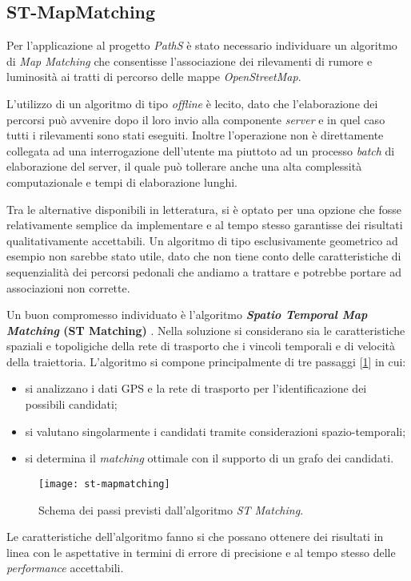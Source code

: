 \subsection{ST-MapMatching}
Per l'applicazione al progetto \emph{PathS} è stato necessario individuare un algoritmo di \emph{Map Matching} che consentisse l'associazione dei rilevamenti di rumore e luminosità ai tratti di percorso delle mappe \emph{OpenStreetMap}. 

L'utilizzo di un algoritmo di tipo \emph{offline} è lecito, dato che l'elaborazione dei percorsi può avvenire dopo il loro invio alla componente \emph{server} e in quel caso tutti i rilevamenti sono stati eseguiti. Inoltre l'operazione non è direttamente collegata ad una interrogazione dell'utente ma piuttoto ad un processo \emph{batch} di elaborazione del server, il quale può tollerare anche una alta complessità computazionale e tempi di elaborazione lunghi.

Tra le alternative disponibili in letteratura, si è optato per una opzione che fosse relativamente semplice da implementare e al tempo stesso garantisse dei risultati qualitativamente accettabili. Un algoritmo di tipo esclusivamente geometrico ad esempio non sarebbe stato utile, dato che non tiene conto delle caratteristiche di sequenzialità dei percorsi pedonali che andiamo a trattare e potrebbe portare ad associazioni non corrette.

Un buon compromesso individuato è l'algoritmo \textbf{\emph{Spatio Temporal Map Matching} (ST Matching)} \cite{stmapmatching}. Nella soluzione si considerano sia le caratteristiche spaziali e topoligiche della rete di trasporto che i vincoli temporali e di velocità della traiettoria. L'algoritmo si compone principalmente di tre passaggi [\ref{fig:st-mapmatching}] in cui:
\begin{itemize}
	\item si analizzano i dati GPS e la rete di trasporto per l'identificazione dei possibili candidati;
	\item si valutano singolarmente i candidati tramite considerazioni spazio-temporali;
	\item si determina il \emph{matching} ottimale con il supporto di un grafo dei candidati.
\end{itemize}
\begin{figure}[h]
  \centering
  \texttt{[image: st-mapmatching]}
  \caption{\footnotesize{Schema dei passi previsti dall'algoritmo \emph{ST Matching}.}}
  \label{fig:st-mapmatching}
\end{figure}
Le caratteristiche dell'algoritmo fanno si che possano ottenere dei risultati in linea con le aspettative in termini di errore di precisione e al tempo stesso delle \emph{performance} accettabili. 

